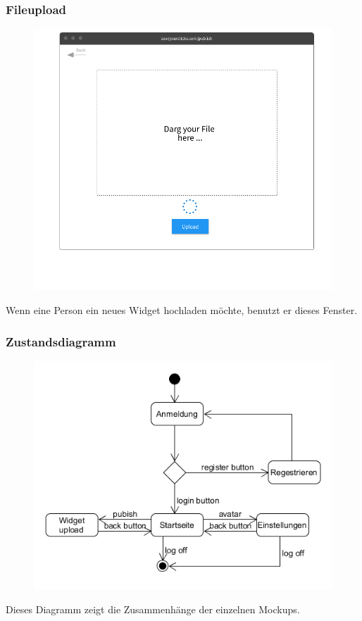 		\subsubsection{Fileupload}
			\begin{figure}[H]
				\includegraphics[scale=0.5]{images/p4}
			\end{figure}
			Wenn eine Person ein neues Widget hochladen möchte, benutzt er dieses Fenster.
		
		\subsubsection{Zustandsdiagramm}
			\begin{figure}[H]
				\includegraphics[scale=0.8]{images/zustand}
			\end{figure}
			Dieses Diagramm zeigt die Zusammenhänge der einzelnen Mockups.
	
